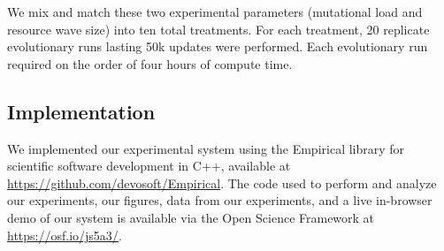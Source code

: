 We mix and match these two experimental parameters (mutational load and resource wave size) into ten total treatments.
For each treatment, 20 replicate evolutionary runs lasting 50k updates were performed.
Each evolutionary run required on the order of four hours of compute time.

\subsection{Implementation}

We implemented our experimental system using the Empirical library for scientific software development in C++, available at \url{https://github.com/devosoft/Empirical}.
The code used to perform and analyze our experiments, our figures, data from our experiments, and a live in-browser demo of our system is available via the Open Science Framework at \url{https://osf.io/js5a3/}.
